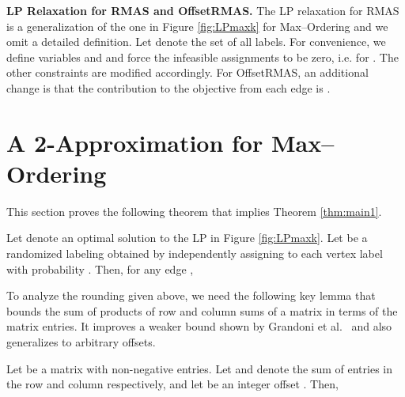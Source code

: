 \documentclass[oribibl]{llncs}
\newcommand{\maxk}{{\sc Max--Ordering}\xspace}
\newcommand{\rmas}{{\sc RMAS}\xspace}
\newcommand{\rmasoff}{{\sc OffsetRMAS}\xspace}
\begin{document}
\smallskip
\noindent
{\bf LP Relaxation for \rmas and \rmasoff.} 
The LP relaxation for \rmas is
a generalization of the one in Figure
\ref{fig:LPmaxk} for \maxk and we omit a detailed definition. Let  denote the set of all labels.
For convenience, we define variables  and  and force the infeasible assignments to be zero, i.e.  for . The other constraints
are modified accordingly.  For \rmasoff, an additional change is
that the contribution to the objective from each edge  is
. 

\section{A 2-Approximation for \maxk}
\label{sec:lp-rounding}

This section proves the following theorem that implies 
Theorem \ref{thm:main1}.
\begin{theorem}
\label{thm:2-approx} Let  denote an optimal solution
to the LP in Figure \ref{fig:LPmaxk}. Let  
be a randomized labeling
obtained by independently assigning to each vertex  
label   with probability
. Then, for any edge ,
 
\end{theorem}
To analyze the rounding given above, we  need the following key 
lemma that bounds the sum of
products of row and column sums of a matrix in terms of the matrix
entries. It improves a weaker bound shown by Grandoni
et al.~\cite{grandoni2015lp} and also generalizes to arbitrary
offsets.
\begin{lemma}
\label{lem:psd}
Let  be a  matrix with non-negative entries.
Let  and  denote the sum
of entries in the  row and  column
respectively, and let  be an integer offset . 
Then,

\end{lemma}
\end{document}
